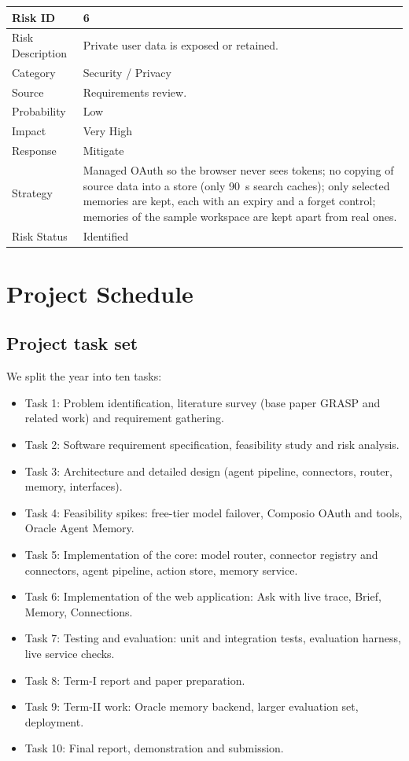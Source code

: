 \documentclass[oneside,a4paper,12pt]{report}
\begin{document}
\begin{table}[!htbp]
\begin{center}
\def\arraystretch{1.5}
\begin{tabularx}{\textwidth}{| l | X |}
\hline
Risk ID	& 6 \\ \hline
Risk Description	& Private user data is exposed or retained. \\ \hline
Category	& Security / Privacy \\ \hline
Source	& Requirements review. \\ \hline
Probability	& Low \\ \hline
Impact	& Very High \\ \hline
Response	& Mitigate \\ \hline
Strategy	& Managed OAuth so the browser never sees tokens; no copying of source data into a store (only 90~s search caches); only selected memories are kept, each with an expiry and a forget control; memories of the sample workspace are kept apart from real ones. \\ \hline
Risk Status	& Identified \\ \hline
\end{tabularx}
\end{center}
\label{tab:risk6}
\end{table}

\section{Project Schedule}
\label{sec:schedule}
\subsection{Project task set}
\label{sec:taskset}
We split the year into ten tasks:
\begin{itemize}
  \item Task 1: Problem identification, literature survey (base paper GRASP and related work) and requirement gathering.
  \item Task 2: Software requirement specification, feasibility study and risk analysis.
  \item Task 3: Architecture and detailed design (agent pipeline, connectors, router, memory, interfaces).
  \item Task 4: Feasibility spikes: free-tier model failover, Composio OAuth and tools, Oracle Agent Memory.
  \item Task 5: Implementation of the core: model router, connector registry and connectors, agent pipeline, action store, memory service.
  \item Task 6: Implementation of the web application: Ask with live trace, Brief, Memory, Connections.
  \item Task 7: Testing and evaluation: unit and integration tests, evaluation harness, live service checks.
  \item Task 8: Term-I report and paper preparation.
  \item Task 9: Term-II work: Oracle memory backend, larger evaluation set, deployment.
  \item Task 10: Final report, demonstration and submission.
\end{itemize}
\end{document}
